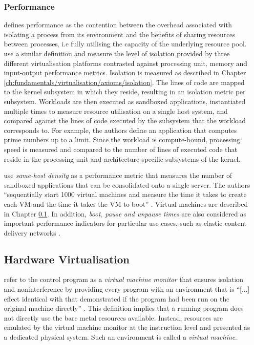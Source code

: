 \subsubsection{Performance}
\label{ch:fundamentals/virtualisation/axioms/performance}
\textcite{10.1145/3365199} defines performance as the contention between the overhead associated 
with isolating a process from its environment and the benefits of sharing resources between processes,
i.e fully utilising the capacity of the underlying resource pool. \textcite{10.1145/3381052.3381315}
use a similar definition and measure the level of isolation provided by three different virtualisation 
platforms contrasted against processing unit, memory and input-output performance metrics. 
Isolation is measured as described in Chapter \ref{ch:fundamentals/virtualisation/axioms/isolation}.
The lines of code are mapped to the kernel 
subsystem in which they reside, resulting in an isolation metric per subsystem.
Workloads are then executed as sandboxed applications, instantiated multiple times to measure resource 
utilisation on a single host system, and compared against the lines of code executed by the subsystem 
that the workload corresponds to. For example, the authors define an application that computes prime numbers up 
to a limit. Since the workload is compute-bound, processing speed is measured and compared to the 
number of lines of executed code that reside in the processing unit and architecture-specific subsystems of
the kernel.

\textcite{10.1145/3132747.3132763} use \textit{same-host density} as a performance metric that measures 
the number of sandboxed applications that can be consolidated onto a single server.
The authors \enquote{sequentially start 1000 virtual machines and measure the time it takes to
create each VM and the time it takes the VM to boot} \cite[5]{10.1145/3132747.3132763}. 
Virtual machines are described in Chapter \ref{ch:fundamentals/virtualisation/hardware-virtualisation}.
In addition, \textit{boot, pause and unpause times} are also considered as important performance indicators for particular 
use cases, such as elastic content delivery networks \cite{10.1145/3050748.3050757} \cite{10.1145/3132747.3132763}.

\subsection{Hardware Virtualisation}
\label{ch:fundamentals/virtualisation/hardware-virtualisation}
\textcite{10.1145/361011.361073} refer to the control program as a \textit{virtual machine monitor} that 
ensures isolation and noninterference by providing every program with an environment that is \enquote{[...] effect
identical with that demonstrated if the program had been run on the original machine directly} 
\cite[2]{10.1145/361011.361073}. This definition implies that a running program does not directly use
the bare metal resources available. Instead, resources are emulated by the virtual machine monitor at
the instruction level and presented as a dedicated physical system. Such an environment is called 
a \textit{virtual machine}.

